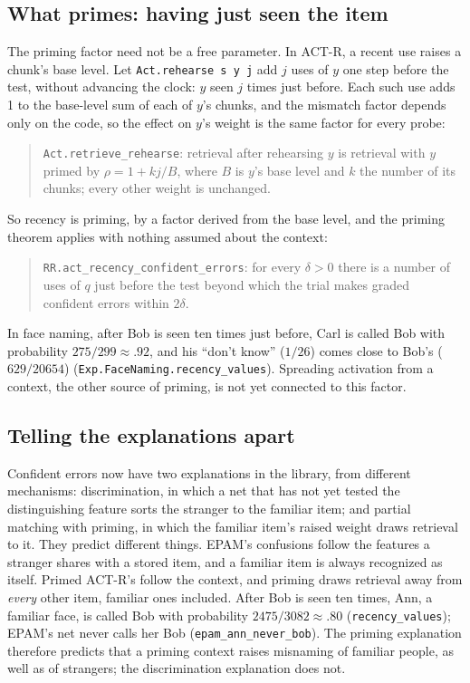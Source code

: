\documentclass[11pt]{article}
\newcommand{\lean}[1]{\texttt{#1}}
\begin{document}
\subsection{What primes: having just seen the item}

The priming factor need not be a free parameter. In ACT-R, a recent use raises a chunk's base level. Let \lean{Act.rehearse~s~y~j} add $j$ uses of $y$ one step before the test, without advancing the clock: $y$ seen $j$ times just before. Each such use adds 1 to the base-level sum of each of $y$'s chunks, and the mismatch factor depends only on the code, so the effect on $y$'s weight is the same factor for every probe:

\begin{quote}
\lean{Act.retrieve\_rehearse}: retrieval after rehearsing $y$ is retrieval with $y$ primed by $\rho = 1 + kj/B$, where $B$ is $y$'s base level and $k$ the number of its chunks; every other weight is unchanged.
\end{quote}

So recency is priming, by a factor derived from the base level, and the priming theorem applies with nothing assumed about the context:

\begin{quote}
\lean{RR.act\_recency\_confident\_errors}: for every $\delta > 0$ there is a number of uses of $q$ just before the test beyond which the trial makes graded confident errors within $2\delta$.
\end{quote}

In face naming, after Bob is seen ten times just before, Carl is called Bob with probability $275/299 \approx .92$, and his ``don't know'' ($1/26$) comes close to Bob's ($629/20654$) (\lean{Exp.FaceNaming.recency\_values}). Spreading activation from a context, the other source of priming, is not yet connected to this factor.

\subsection{Telling the explanations apart}

Confident errors now have two explanations in the library, from different mechanisms: discrimination, in which a net that has not yet tested the distinguishing feature sorts the stranger to the familiar item; and partial matching with priming, in which the familiar item's raised weight draws retrieval to it. They predict different things. EPAM's confusions follow the features a stranger shares with a stored item, and a familiar item is always recognized as itself. Primed ACT-R's follow the context, and priming draws retrieval away from \emph{every} other item, familiar ones included. After Bob is seen ten times, Ann, a familiar face, is called Bob with probability $2475/3082 \approx .80$ (\lean{recency\_values}); EPAM's net never calls her Bob (\lean{epam\_ann\_never\_bob}). The priming explanation therefore predicts that a priming context raises misnaming of familiar people, as well as of strangers; the discrimination explanation does not.
\end{document}

